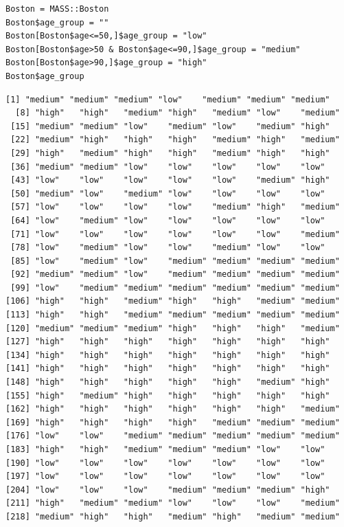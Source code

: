 \documentclass{article}
\begin{document}
\begin{lstlisting}[style={r-style}]
Boston = MASS::Boston
Boston$age_group = ""
Boston[Boston$age<=50,]$age_group = "low"
Boston[Boston$age>50 & Boston$age<=90,]$age_group = "medium"
Boston[Boston$age>90,]$age_group = "high"
Boston$age_group
\end{lstlisting}
\begin{lstlisting}[style={out-style}]
  [1] "medium" "medium" "medium" "low"    "medium" "medium" "medium"
  [8] "high"   "high"   "medium" "high"   "medium" "low"    "medium"
 [15] "medium" "medium" "low"    "medium" "low"    "medium" "high"  
 [22] "medium" "high"   "high"   "high"   "medium" "high"   "medium"
 [29] "high"   "medium" "high"   "high"   "medium" "high"   "high"  
 [36] "medium" "medium" "low"    "low"    "low"    "low"    "low"   
 [43] "low"    "low"    "low"    "low"    "low"    "medium" "high"  
 [50] "medium" "low"    "medium" "low"    "low"    "low"    "low"   
 [57] "low"    "low"    "low"    "low"    "medium" "high"   "medium"
 [64] "low"    "medium" "low"    "low"    "low"    "low"    "low"   
 [71] "low"    "low"    "low"    "low"    "low"    "low"    "medium"
 [78] "low"    "medium" "low"    "low"    "medium" "low"    "low"   
 [85] "low"    "medium" "low"    "medium" "medium" "medium" "medium"
 [92] "medium" "medium" "low"    "medium" "medium" "medium" "medium"
 [99] "low"    "medium" "medium" "medium" "medium" "medium" "medium"
[106] "high"   "high"   "medium" "high"   "high"   "medium" "medium"
[113] "high"   "high"   "medium" "medium" "medium" "medium" "medium"
[120] "medium" "medium" "medium" "high"   "high"   "high"   "medium"
[127] "high"   "high"   "high"   "high"   "high"   "high"   "high"  
[134] "high"   "high"   "high"   "high"   "high"   "high"   "high"  
[141] "high"   "high"   "high"   "high"   "high"   "high"   "high"  
[148] "high"   "high"   "high"   "high"   "high"   "medium" "high"  
[155] "high"   "medium" "high"   "high"   "high"   "high"   "high"  
[162] "high"   "high"   "high"   "high"   "high"   "high"   "medium"
[169] "high"   "high"   "high"   "high"   "medium" "medium" "medium"
[176] "low"    "low"    "medium" "medium" "medium" "medium" "medium"
[183] "high"   "high"   "medium" "medium" "medium" "low"    "low"   
[190] "low"    "low"    "low"    "low"    "low"    "low"    "low"   
[197] "low"    "low"    "low"    "low"    "low"    "low"    "low"   
[204] "low"    "low"    "low"    "medium" "medium" "medium" "high"  
[211] "high"   "medium" "medium" "low"    "low"    "low"    "medium"
[218] "medium" "high"   "high"   "medium" "high"   "medium" "medium"

\end{lstlisting}
\end{document}
